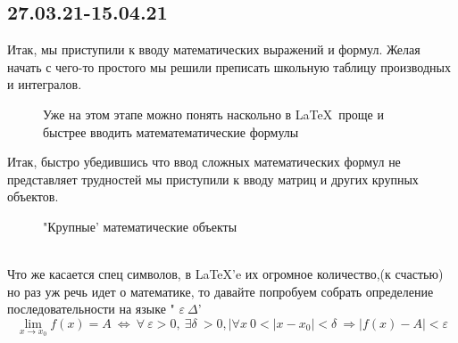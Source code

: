 \documentclass[a4paper,12pt]{report}
\begin{document}
\subsection{27.03.21-15.04.21}
Итак, мы приступили к вводу математических выражений и формул. Желая начать с чего-то простого мы решили преписать школьную таблицу производных и интегралов.
\begin{figure}[h!]
\setlength{\fboxsep}{0pt}%
\setlength{\fboxrule}{1pt}%
%
\caption{Уже на этом этапе можно понять наскольно в \LaTeX \  проще и быстрее вводить математематические формулы}
\label{fig:image}
\end{figure}
\newpage
Итак, быстро убедившись что ввод сложных математических формул не представляет трудностей мы приступили к вводу матриц и других крупных объектов.
\begin{figure}[h!]
\setlength{\fboxsep}{0pt}%
\setlength{\fboxrule}{1pt}%
%
\caption{"Крупные' математические объекты}
\end{figure}
\\
Что же касается спец символов, в \LaTeX 'e их огромное количество,(к счастью) но раз уж речь идет о математике, то давайте попробуем собрать определение последовательности на языке " $\varepsilon \ \Delta $'
$$\lim_{x \rightarrow x_0}f(x) = A \  \Leftrightarrow \   \forall \ \varepsilon > 0, \ \exists \delta \ >0, |\forall x \ 0<|x-x_0|<\delta \ \Rightarrow |f(x) - A|< \varepsilon   $$
\end{document}
